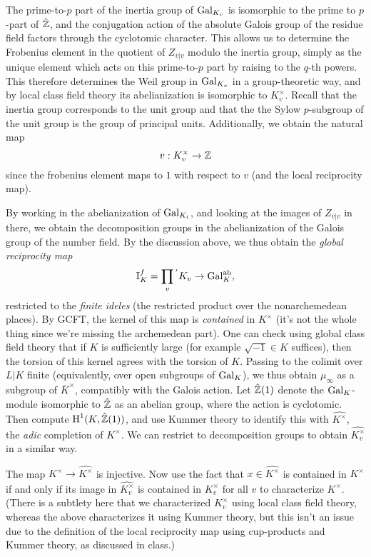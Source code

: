 The prime-to-$p$ part of the inertia group of $\operatorname{Gal}_{K_{v}}$ is isomorphic to the prime to $p$-part of $\hat{\mathbb{Z}}$, and the conjugation action of the absolute Galois group of the residue field factors through the cyclotomic character.
This allows us to determine the Frobenius element in the quotient of $Z_{\bar v|v}$ modulo the inertia group, simply as the unique element which acts on this prime-to-$p$ part by raising to the $q$-th powers.
This therefore determines the Weil group in $\operatorname{Gal}_{K_{v}}$ in a group-theoretic way, and by local class field theory its abelianization is isomorphic to $K_{v}^{\times}$.
Recall that the inertia group corresponds to the unit group and that the the Sylow $p$-subgroup of the unit group is the group of principal units.
Additionally, we obtain the natural map
\[ v : K_{v}^{\times} \to \mathbb{Z} \]
since the frobenius element maps to $1$ with respect to $v$ (and the local reciprocity map).

By working in the abelianization of $\operatorname{Gal}_{K_{i}}$, and looking at the images of $Z_{\bar v|v}$ in there, we obtain the decomposition groups in the abelianization of the Galois group of the number field.
By the discussion above, we thus obtain the \emph{global reciprocity map}
\[ \mathbb{I}^{f}_{K} = \prod_{v}{}^{'}K_{v} \to \operatorname{Gal}_{K}^{\mathrm{ab}}, \]
restricted to the \emph{finite ideles} (the restricted product over the nonarchemedean places).
By GCFT, the kernel of this map is \emph{contained} in $K^{\times}$ (it's not the whole thing since we're missing the archemedean part).
One can check using global class field theory that if $K$ is sufficiently large (for example $\sqrt{-1} \in K$ suffices), then the torsion of this kernel agrees with the torsion of $K$.
Passing to the colimit over $L|K$ finite (equivalently, over open subgroups of $\operatorname{Gal}_{K}$), we thus obtain $\mu_{\infty}$ as a subgroup of $\bar K^{\times}$, compatibly with the Galois action.
Let $\hat{\mathbb{Z}}(1)$ denote the $\operatorname{Gal}_{K}$-module isomorphic to $\hat{\mathbb{Z}}$ as an abelian group, where the action is cyclotomic.
Then compute $\operatorname{H}^{1}(K,\hat{\mathbb{Z}}(1))$, and use Kummer theory to identify this with $\hat{K^{\times}}$, the \emph{adic} completion of $K^{\times}$.
We can restrict to decomposition groups to obtain $\hat{K_{v}^{\times}}$ in a similar way.

The map $K^{\times} \to \hat{K^{\times}}$ is injective.
Now use the fact that $x \in \hat{K^{\times}}$ is contained in $K^{\times}$ if and only if its image in $\hat{K_{v}^{\times}}$ is contained in $K_{v}^{\times}$ for all $v$ to characterize $K^{\times}$.
(There is a subtlety here that we characterized $K_{v}^{\times}$ using local class field theory, whereas the above characterizes it using Kummer theory, but this isn't an issue due to the definition of the local reciprocity map using cup-products and Kummer theory, as discussed in class.)

